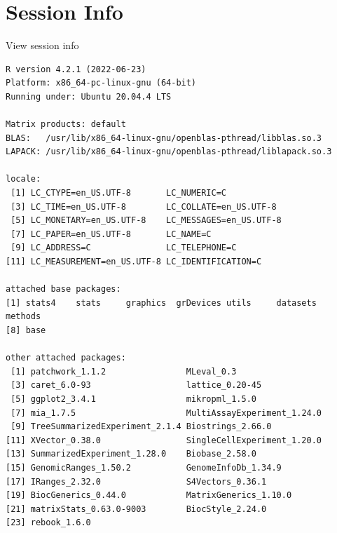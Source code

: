 \documentclass[
]{book}
\begin{document}
\hypertarget{session-info-8}{%
\section*{Session Info}\label{session-info-8}}

View session info

\begin{verbatim}
R version 4.2.1 (2022-06-23)
Platform: x86_64-pc-linux-gnu (64-bit)
Running under: Ubuntu 20.04.4 LTS

Matrix products: default
BLAS:   /usr/lib/x86_64-linux-gnu/openblas-pthread/libblas.so.3
LAPACK: /usr/lib/x86_64-linux-gnu/openblas-pthread/liblapack.so.3

locale:
 [1] LC_CTYPE=en_US.UTF-8       LC_NUMERIC=C              
 [3] LC_TIME=en_US.UTF-8        LC_COLLATE=en_US.UTF-8    
 [5] LC_MONETARY=en_US.UTF-8    LC_MESSAGES=en_US.UTF-8   
 [7] LC_PAPER=en_US.UTF-8       LC_NAME=C                 
 [9] LC_ADDRESS=C               LC_TELEPHONE=C            
[11] LC_MEASUREMENT=en_US.UTF-8 LC_IDENTIFICATION=C       

attached base packages:
[1] stats4    stats     graphics  grDevices utils     datasets  methods  
[8] base     

other attached packages:
 [1] patchwork_1.1.2                MLeval_0.3                    
 [3] caret_6.0-93                   lattice_0.20-45               
 [5] ggplot2_3.4.1                  mikropml_1.5.0                
 [7] mia_1.7.5                      MultiAssayExperiment_1.24.0   
 [9] TreeSummarizedExperiment_2.1.4 Biostrings_2.66.0             
[11] XVector_0.38.0                 SingleCellExperiment_1.20.0   
[13] SummarizedExperiment_1.28.0    Biobase_2.58.0                
[15] GenomicRanges_1.50.2           GenomeInfoDb_1.34.9           
[17] IRanges_2.32.0                 S4Vectors_0.36.1              
[19] BiocGenerics_0.44.0            MatrixGenerics_1.10.0         
[21] matrixStats_0.63.0-9003        BiocStyle_2.24.0              
[23] rebook_1.6.0                  


\end{verbatim}
\end{document}
